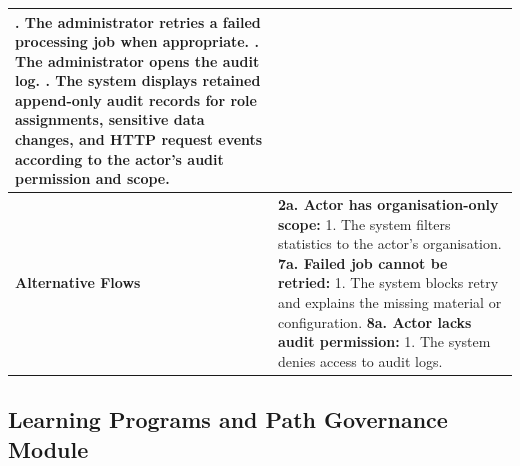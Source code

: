 \begin{longtable}{|>{\raggedright\arraybackslash}p{}|>{\raggedright\arraybackslash}p{}|}
7. The administrator retries a failed processing job when appropriate. \newline
8. The administrator opens the audit log. \newline
9. The system displays retained append-only audit records for role assignments, sensitive data changes, and HTTP request events according to the actor's audit permission and scope. \\ \hline
\textbf{Alternative Flows} &
\textbf{2a. Actor has organisation-only scope:} \newline
\hspace*{1em}1. The system filters statistics to the actor's organisation. \newline
\textbf{7a. Failed job cannot be retried:} \newline
\hspace*{1em}1. The system blocks retry and explains the missing material or configuration. \newline
\textbf{8a. Actor lacks audit permission:} \newline
\hspace*{1em}1. The system denies access to audit logs. \\
\end{longtable}


\subsection{Learning Programs and Path Governance Module}

